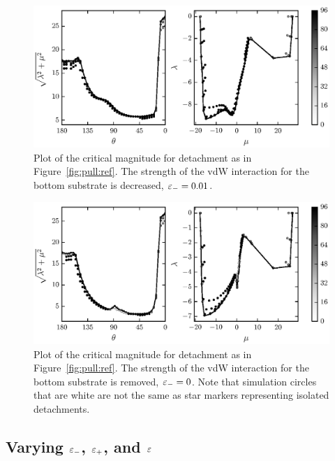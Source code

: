    \begin{figure}[t]
      \begin{center}
         \includegraphics{./fig/ch3/pull/eb0.01/grid.eps}
      \end{center}      
      \caption{Plot of the critical magnitude for detachment as in Figure~\ref{fig:pull:ref}. The strength of the vdW interaction for the bottom substrate is decreased, $\varepsilon_-=0.01$. 
      \label{fig:pull:eb0.01}}
   \end{figure}
   
   \begin{figure}[t]
      \begin{center}
         \includegraphics{./fig/ch3/pull/eb0/grid.eps}
      \end{center}      
      \caption{Plot of the critical magnitude for detachment as in Figure~\ref{fig:pull:ref}. The strength of the vdW interaction for the bottom substrate is removed, $\varepsilon_-=0$. Note that simulation circles that are white are not the same as star markers representing isolated detachments.
      \label{fig:pull:eb0}}
   \end{figure}

\subsection{Varying $\varepsilon_-$, $\varepsilon_+$, and $\varepsilon$} \label{section:detachment:eps}


